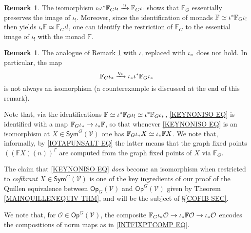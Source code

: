 \documentclass[a4paper,10pt
,draft
]{article}%
\numberwithin{equation}{section}
\numberwithin{figure}{section}
\theoremstyle{definition} %
\newtheorem{remark}[equation]{Remark}%
\newcommand{\1}{\ensuremath{\mathbbm 1}}%
\begin{document}
\begin{remark}\label{MUTMUT1 REM}
	The isomorphism
	$\iota_{!}\iota^{\**} \mathbb{F}_G \iota_{!}
	\xrightarrow{\epsilon_!}
	\mathbb{F}_G \iota_{!}$
	shows that $\mathbb{F}_G$ essentially preserves the image of $\iota_!$.
	Moreover, since the identification of monads 
	$\mathbb{F} \simeq \iota^{\**} \mathbb{F}_G \iota_{!}$ 
	then yields 
	$\iota_! \mathbb{F} \simeq \mathbb{F}_G \iota!$,
	one can identify the restriction of 
	$\mathbb{F}_G$ to the essential image of $\iota_!$
	with the monad $\mathbb{F}$.
\end{remark}



\begin{remark}\label{MUTMUT2 REM}
The analogue of Remark \ref{MUTMUT1 REM} with $\iota_!$ replaced with $\iota_{\**}$ does not hold. In particular, 
the map
\begin{equation}\label{KEYNONISO EQ}
	\mathbb{F}_G \iota_{\**}
	\xrightarrow{\eta_{\**}}
	\iota_{\**}\iota^{\**} \mathbb{F}_G \iota_{\**}
\end{equation}
is not always an isomorphism 
(a counterexample is discussed at the end of this remark). 

Note that, via the identifications
$\mathbb{F} \simeq 
\iota^{\**} \mathbb{F}_G \iota_! \simeq
\iota^{\**} \mathbb{F}_G \iota_{\**}$,
\eqref{KEYNONISO EQ} is identified with a map
$\mathbb{F}_G \iota_{\**} \to  \iota_{\**} \mathbb{F}$,
so that whenever \eqref{KEYNONISO EQ} is an isomorphism
at $X \in \mathsf{Sym}^G(\mathcal{V})$
one has $\mathbb{F}_G \iota_{\**} X \simeq  \iota_{\**} \mathbb{F}X$.
We note that, informally, 
by \eqref{IOTAFUNSALT EQ} the latter means that
the graph fixed points
$\left(\left(\mathbb{F} X\right)(n)\right)^{\Gamma}$
are computed from the graph fixed points of $X$
via $\mathbb{F}_G$.

The claim that \eqref{KEYNONISO EQ}
\textit{does} become an isomorphism when restricted to \textit{cofibrant} $X \in \mathsf{Sym}^G(\mathcal{V})$
is one of the key ingredients of our proof of the Quillen equivalence between 
$\mathsf{Op}_G(\mathcal{V})$ and
$\mathsf{Op}^G(\mathcal{V})$
given by Theorem \ref{MAINQUILLENEQUIV THM}, 
and will be the subject of \S \ref{COFIB SEC}.

We note that, 
for $\mathcal{O} \in \mathsf{Op}^G(\mathcal{V})$,
the composite
$\mathbb{F}_G \iota_{\**} \mathcal{O}
\to 
\iota_{\**} \mathbb{F} \mathcal{O}
\to 
\iota_{\**} \mathcal{O}$
encodes the compositions of norm maps as in 
\eqref{INTFIXPTCOMP EQ}.


\end{remark}
\end{document}
